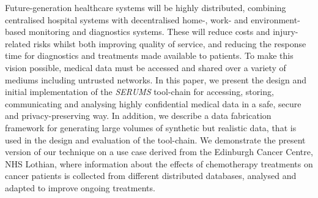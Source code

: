 Future-generation healthcare systems will be highly distributed, combining centralised hospital systems with decentralised home-, work- and environment-based monitoring and diagnostics systems. These will reduce costs and injury-related risks whilst both improving quality of service, and reducing the response time for diagnostics and treatments made available to patients. To make this vision possible, medical data must be accessed and shared over a variety of mediums including untrusted networks. In this paper, we present the design and initial implementation of the \emph{SERUMS} tool-chain for accessing, storing, communicating and analysing highly confidential medical data in a safe, secure and privacy-preserving way. In addition, we describe a data fabrication framework for generating large volumes of synthetic but realistic data, that is used in the design and evaluation of the tool-chain. We demonstrate the present version of our technique on a use case derived from the Edinburgh Cancer Centre, NHS Lothian, where information about the effects of chemotherapy treatments on cancer patients is collected from different distributed databases, analysed and adapted to improve ongoing treatments.



